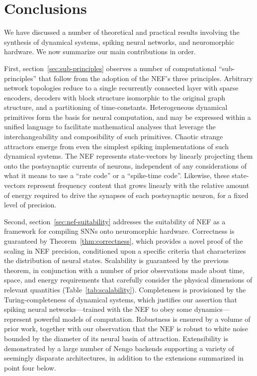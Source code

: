 \chapter{Conclusions}
\label{chapt:conclusions}

We have discussed a number of theoretical and practical results involving the synthesis of dynamical systems, spiking neural networks, and neuromorphic hardware.
We now summarize our main contributions in order.

First, section~\ref{sec:sub-principles} observes a number of computational ``sub-principles'' that follow from the adoption of the NEF's three principles.
Arbitrary network topologies reduce to a single recurrently connected layer with sparse encoders, decoders with block structure isomorphic to the original graph structure, and a partitioning of time-constants.
Heterogeneous dynamical primitives form the basis for neural computation, and may be expressed within a unified language to facilitate mathematical analyses that leverage the interchangeability and composibility of such primitives.
Chaotic strange attractors emerge from even the simplest spiking implementations of such dynamical systems.
The NEF represents state-vectors by linearly projecting them onto the postsynaptic currents of neurons,  independent of any considerations of what it means to use a ``rate code'' or a ``spike-time code''.
Likewise, these state-vectors represent frequency content that grows linearly with the relative amount of energy required to drive the synapses of each postsynaptic neuron, for a fixed level of precision.

Second, section~\ref{sec:nef-suitability} addresses the suitability of NEF as a framework for compiling SNNs onto neuromorphic hardware.
Correctness is guaranteed by Theorem~\ref{thm:correctness}, which provides a novel proof of the scaling in NEF precision, conditioned upon a specific criteria that characterizes the distribution of neural states.
Scalability is guaranteed by the previous theorem, in conjunction with a number of prior observations made about time, space, and energy requirements that carefully consider the physical dimensions of relevant quantities (Table~\ref{tab:scalability}).
Completeness is provisioned by the Turing-completeness of dynamical systems, which justifies our assertion that spiking neural networks---trained with the NEF to obey some dynamics---represent powerful models of computation.
Robustness is ensured by a volume of prior work, together with our observation that the NEF is robust to white noise bounded by the diameter of its neural basin of attraction.
Extensibility is demonstrated by a large number of Nengo backends supporting a variety of seemingly disparate architectures, in addition to the extensions summarized in point four below.

